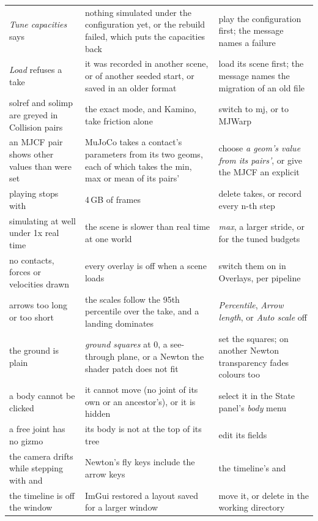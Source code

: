 \begin{longtable}{@{}L{44mm}L{50mm}L{59mm}@{}}
\emph{Tune capacities} says  & nothing simulated under the configuration yet, or the rebuild failed, which puts the capacities back & play the configuration first; the message names a failure \\
\emph{Load} refuses a take & it was recorded in another scene, or of another seeded start, or saved in an older format & load its scene first; the message names the migration of an old file \\
solref and solimp are greyed in Collision pairs & the exact mode, and Kamino, take friction alone & switch to mj, or to MJWarp \\
an MJCF pair shows other values than were set & MuJoCo takes a contact's parameters from its two geoms, each of which takes the min, max or mean of its pairs' & choose \emph{a geom's value from its pairs'}, or give the MJCF an explicit  \\
playing stops with  & 4\,GB of frames & delete takes, or record every n-th step \\
simulating at well under 1x real time & the scene is slower than real time at one world & \emph{max}, a larger stride, or  for the tuned budgets \\
no contacts, forces or velocities drawn & every overlay is off when a scene loads & switch them on in Overlays, per pipeline \\
arrows too long or too short & the scales follow the 95th percentile over the take, and a landing dominates & \emph{Percentile}, \emph{Arrow length}, or \emph{Auto scale} off \\
the ground is plain & \emph{ground squares} at 0, a see-through plane, or a Newton the shader patch does not fit & set the squares; on another Newton transparency fades colours too \\
a body cannot be clicked & it cannot move (no joint of its own or an ancestor's), or it is hidden & select it in the State panel's \emph{body} menu \\
a free joint has no gizmo & its body is not at the top of its tree & edit its fields \\
the camera drifts while stepping with  and  & Newton's fly keys include the arrow keys & the timeline's \code{<} and \code{>} \\
the timeline is off the window & ImGui restored a layout saved for a larger window & move it, or delete  in the working directory \\

\end{longtable}
